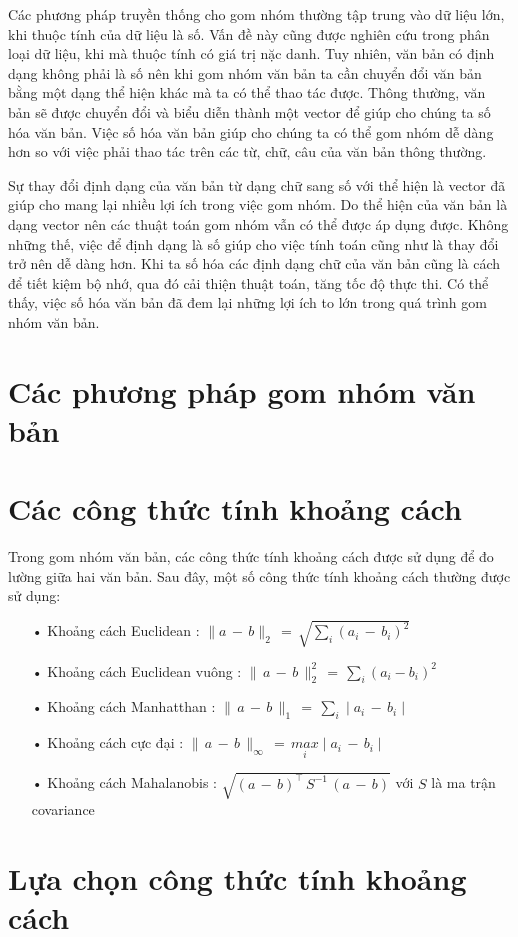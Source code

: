 Các phương pháp truyền thống cho gom nhóm thường tập trung vào dữ liệu lớn, khi thuộc tính của dữ liệu là số.
Vấn đề này cũng được nghiên cứu trong phân loại dữ liệu, khi mà thuộc tính có giá trị nặc danh.
Tuy nhiên, văn bản có định dạng không phải là số nên khi gom nhóm văn bản ta cần chuyển đổi văn bản bằng một dạng thể hiện khác mà ta có thể thao tác được.
Thông thường, văn bản sẽ được chuyển đổi và biểu diễn thành một vector để giúp cho chúng ta số hóa văn bản.
Việc số hóa văn bản giúp cho chúng ta có thể gom nhóm dễ dàng hơn so với việc phải thao tác trên các từ, chữ, câu của văn bản thông thường.

Sự thay đổi định dạng của văn bản từ dạng chữ sang số với thể hiện là vector đã giúp cho mang lại nhiều lợi ích trong việc gom nhóm.
Do thể hiện của văn bản là dạng vector nên các thuật toán gom nhóm vẫn có thể được áp dụng được.
Không những thế, việc để định dạng là số giúp cho việc tính toán cũng như là thay đổi trở nên dễ dàng hơn.
Khi ta số hóa các định dạng chữ của văn bản cũng là cách để tiết kiệm bộ nhớ, qua đó cải thiện thuật toán, tăng tốc độ thực thi.
Có thể thấy, việc số hóa văn bản đã đem lại những lợi ích to lớn trong quá trình gom nhóm văn bản.


\section{Các phương pháp gom nhóm văn bản}

\section{Các công thức tính khoảng cách}
Trong gom nhóm văn bản, các công thức tính khoảng cách được sử dụng để đo lường giữa hai văn bản. Sau đây, một số công thức tính khoảng cách thường được sử dụng:
\begin{enumerate}
\item[•]Khoảng cách Euclidean : $\parallel a \,- \, b \parallel_2 \, = \, \sqrt{\underset{i}{\sum}(a_i \, - \, b_i)^2} $
\item[•]Khoảng cách Euclidean vuông : $\parallel \, a \, - \, b \, \parallel^2_2 \, = \, \underset{i}{\sum} (a_i - b_i)^2$
\item[•]Khoảng cách Manhatthan : $\parallel \, a \, - \, b \, \parallel_1 \, = \, \underset{i}{\sum} \mid a_i \, - \, b_i\mid$
\item[•]Khoảng cách cực đại : $\parallel \, a \, - \, b\, \parallel_\infty \, = \, \underset{i}{max} \mid a_i \, - \, b_i \mid$
\item[•]Khoảng cách Mahalanobis : $\sqrt{(a \, - \, b)^{\top} \, S^{-1} \, (a \, - \, b)}$ với $S$ là ma trận covariance
\end{enumerate}

\section{Lựa chọn công thức tính khoảng cách}

